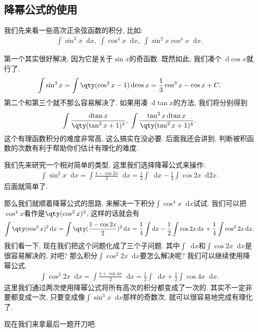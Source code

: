 \documentclass{ctexbook}
\newcommand*{\dif}{\mathop{}\!\mathrm{d}}
\begin{document}
{\subsection{降幂公式的使用}
我们先来看一些高次正余弦函数的积分, 比如: 
\begin{align*}
\int\sin^{3}{x}\dif{x},\;\int\cos^{4}{x}\dif{x},\;\int\sin^{2}{x}\cos^{4}{x}\dif{x}
.\end{align*}\par
第一个其实很好解决, 因为它是关于$\sin{x}$的奇函数. 既然如此, 我们凑个$\dif{\cos{x}}$就行了. 
\begin{align*}
\int\sin^{3}{x}=\int\qty(\cos^{2}{x}-1)\dif{\cos{x}}=\frac{1}{3}\cos^{3}{x}-\cos{x}+C
.\end{align*}
第二个和第三个就不那么容易解决了. 如果用凑$\dif{\tan{x}}$的方法, 我们将分别得到
\begin{align*}
\int\frac{\dif{\tan{x}}}{\qty(\tan^{2}{x}+1)^{3}},\;\int\frac{\tan^{2}{x}\dif{\tan{x}}}{\qty(\tan^{2}{x}+1)^{4}}
.\end{align*}
这个有理函数积分的难度非常高, 这么搞实在没必要. 后面我还会讲到, 判断被积函数的次数有利于帮助你们估计有理化的难度. \par
我们先来研究一个相对简单的类型, 这里我们选择降幂公式来操作: 
\begin{align*}
\int\sin^{2}{x}\dif{x}=\int\frac{1-\cos{2x}}{2}\dif{x}=\frac{1}{2}\int\dif{x}-\frac{1}{4}\int\cos{2x}\dif{2x}
.\end{align*}
后面就简单了. \par
那么我们就顺着降幂公式的思路, 来解决一下积分$\int\cos^{4}{x}\dif{x}$试试. 我们可以把$\cos^{4}{x}$看作是$\qty(\cos^{2}{x})^{2}$, 这样的话就会有
\begin{align*}
\int\qty(\cos^{2}{x})^{2}\dif{x}=\int\qty(\frac{1-\cos{2x}}{2})^{2}\dif{x}=\frac{1}{4}\int\dif{x}-\frac{1}{2}\int\cos{2x}\dif{x}+\frac{1}{4}\int\cos^{2}{2x}\dif{x}
.\end{align*}
我们看一下, 现在我们把这个问题化成了三个子问题. 其中$\int\dif{x}$和$\int\cos{2x}\dif{x}$是很容易解决的, 对吧? 那么积分$\int\cos^{2}{2x}\dif{x}$要怎么解决呢? 我们可以继续使用降幂公式. 
\begin{align*}
\int\cos^{2}{2x}\dif{x}=\int\frac{1+\cos{4x}}{2}\dif{x}=\frac{1}{2}\int\dif{x}+\frac{1}{2}\int\cos{4x}\dif{x}
.\end{align*}
这里我们通过两次使用降幂公式将所有高次的积分都变成了一次的. 其实不一定非要都变成一次, 只要变成像$\int\sin^{3}{x}\dif{x}$那样的奇数次, 就可以很容易地完成有理化了. \par
现在我们来拿最后一题开刀吧. 
}
\end{document}
